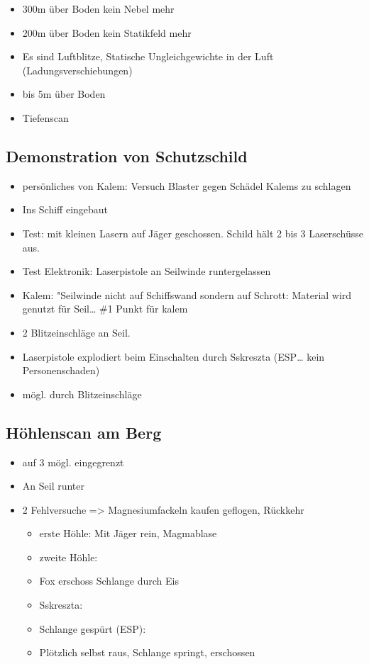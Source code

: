 \documentclass[11pt]{article}
\begin{document}
\begin{itemize}
\item
  300m über Boden kein Nebel mehr
\item
  200m über Boden kein Statikfeld mehr
\item
  Es sind Luftblitze, Statische Ungleichgewichte in der Luft
  (Ladungsverschiebungen)
\item
  bis 5m über Boden
\item
  Tiefenscan
\end{itemize}
\subsection{Demonstration von Schutzschild}

\begin{itemize}
\item
  persönliches von Kalem: Versuch Blaster gegen Schädel Kalems zu
  schlagen
\item
  Ins Schiff eingebaut
\item
  Test: mit kleinen Lasern auf Jäger geschossen. Schild hält 2 bis 3
  Laserschüsse aus.
\item
  Test Elektronik: Laserpistole an Seilwinde runtergelassen
\item
  Kalem: "Seilwinde nicht auf Schiffswand sondern auf Schrott: Material
  wird genutzt für Seil\ldots{} \#1 Punkt für kalem
\item
  2 Blitzeinschläge an Seil.
\item
  Laserpistole explodiert beim Einschalten durch Sskreszta (ESP\ldots{}
  kein Personenschaden)
\item
  mögl. durch Blitzeinschläge
\end{itemize}
\subsection{Höhlenscan am Berg}

\begin{itemize}
\item
  auf 3 mögl. eingegrenzt
\item
  An Seil runter
\item
  2 Fehlversuche =\textgreater{} Magnesiumfackeln kaufen geflogen,
  Rückkehr
  \begin{itemize}
  \item
    erste Höhle: Mit Jäger rein, Magmablase
  \item
    zweite Höhle:
  \item
    Fox erschoss Schlange durch Eis
  \item
    Sskreszta:
  \item
    Schlange gespürt (ESP):
  \item
    Plötzlich selbst raus, Schlange springt, erschossen
  \end{itemize}
\end{itemize}
\end{document}
